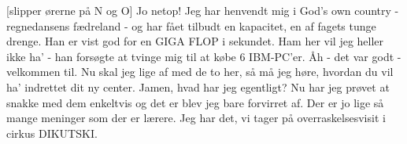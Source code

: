 \documentclass[a4paper,11pt]{article}
\begin{document}
\begin{sketch}
[slipper ørerne på N og O] Jo netop!  Jeg har henvendt mig i God's own country - regnedansens fædreland - og har fået tilbudt en kapacitet, en af fagets tunge drenge.  Han er vist god for en GIGA FLOP i sekundet.
 Ham her vil jeg heller ikke ha' - han forsøgte at tvinge mig til at købe 6 IBM-PC'er.
 Åh - det var godt - velkommen til.  Nu skal jeg lige af med de to her, så må jeg høre, hvordan du vil ha' indrettet dit ny center.
 Jamen, hvad har jeg egentligt?  Nu har jeg prøvet at snakke med dem enkeltvis og det er blev jeg bare forvirret af.  Der er jo lige så mange meninger som der er lærere.
 Jeg har det, vi tager på overraskelsesvisit i cirkus DIKUTSKI.

\end{sketch}
\end{document}
